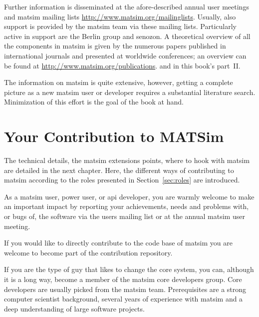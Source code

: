 Further information is disseminated at the afore-described annual user meetings and \gls{matsim} mailing lists \url{http://www.matsim.org/mailinglists}. Usually, also support is provided by the \gls{matsim} team via these mailing lists. Particularly active in support are the Berlin group and \gls{senozon}. A theoretical overview of all the components in \gls{matsim} is given by the numerous papers published in international journals and presented at worldwide conferences; an overview can be found at \url{http://www.matsim.org/publications}.
and in this book's part~II.

The information on \gls{matsim} is quite extensive, however, getting a complete picture as a new \gls{matsim} user or developer requires a substantial literature search. Minimization of this effort is the goal of the book at hand.

\section{Your Contribution to MATSim}
\label{sec:yourcontribution}
The technical details, \ie the \gls{matsim} extensions points, where to hook with \gls{matsim} are detailed in the next chapter. Here, the different ways of contributing to \gls{matsim} according to the roles presented in Section~\ref{sec:roles} are introduced.

As a \gls{matsim} user, power user, or \gls{api} developer, you are warmly welcome to make an important impact by reporting your achievements, needs and problems with, or bugs of, the software via the users mailing list or at the annual \gls{matsim} user meeting. 

If you would like to directly contribute to the code base of \gls{matsim} you are welcome to become part of the \gls{contribution} repository.

If you are the type of guy that likes to change the core system, you can, although it is a long way, become a member of the \gls{matsim} core developers group. Core developers are usually picked from the \gls{matsim} team. Prerequisites are a strong computer scientist background, several years of experience with \gls{matsim} and a deep understanding of large software projects.

